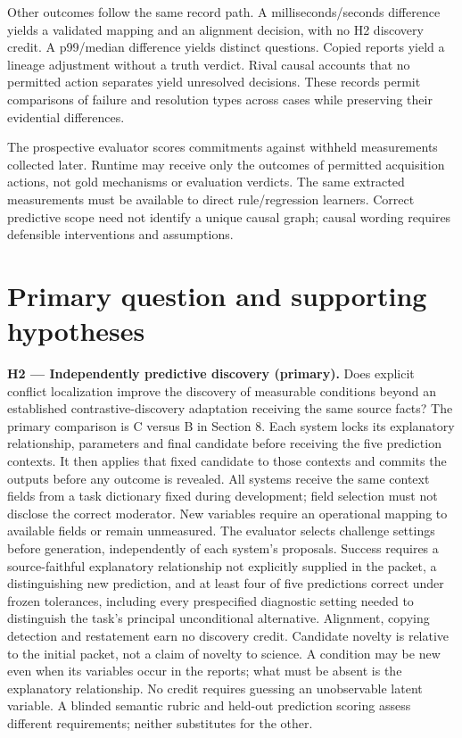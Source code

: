 \documentclass[11pt,a4paper]{article}
\begin{document}
Other outcomes follow the same record path. A milliseconds/seconds
difference yields a validated mapping and an alignment decision, with no
H2 discovery credit. A p99/median difference yields distinct questions.
Copied reports yield a lineage adjustment without a truth verdict. Rival
causal accounts that no permitted action separates yield unresolved
decisions. These records permit comparisons of failure and resolution
types across cases while preserving their evidential differences.

The prospective evaluator scores commitments against withheld
measurements collected later. Runtime may receive only the outcomes of
permitted acquisition actions, not gold mechanisms or evaluation
verdicts. The same extracted measurements must be available to direct
rule/regression learners. Correct predictive scope need not identify a
unique causal graph; causal wording requires defensible interventions
and assumptions.

\section{Primary question and supporting
hypotheses}\label{primary-question-and-supporting-hypotheses}

\textbf{H2 --- Independently predictive discovery (primary).} Does
explicit conflict localization improve the discovery of measurable
conditions beyond an established contrastive-discovery adaptation
receiving the same source facts? The primary comparison is C versus B in
Section 8. Each system locks its explanatory relationship, parameters
and final candidate before receiving the five prediction contexts. It
then applies that fixed candidate to those contexts and commits the
outputs before any outcome is revealed. All systems receive the same
context fields from a task dictionary fixed during development; field
selection must not disclose the correct moderator. New variables require
an operational mapping to available fields or remain unmeasured. The
evaluator selects challenge settings before generation, independently of
each system's proposals. Success requires a source-faithful explanatory
relationship not explicitly supplied in the packet, a distinguishing new
prediction, and at least four of five predictions correct under frozen
tolerances, including every prespecified diagnostic setting needed to
distinguish the task's principal unconditional alternative. Alignment,
copying detection and restatement earn no discovery credit. Candidate
novelty is relative to the initial packet, not a claim of novelty to
science. A condition may be new even when its variables occur in the
reports; what must be absent is the explanatory relationship. No credit
requires guessing an unobservable latent variable. A blinded semantic
rubric and held-out prediction scoring assess different requirements;
neither substitutes for the other.
\end{document}
